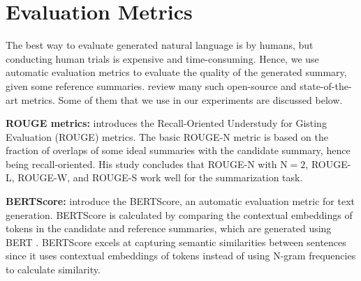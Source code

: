 \section{Evaluation Metrics}
\label{sec:metrics}

The best way to evaluate generated natural language is by humans, but conducting
human trials is expensive and time-consuming.
Hence, we use automatic evaluation metrics to evaluate the quality of the generated
summary, given some reference summaries.
\citet{fabbri2021summeval} review many such open-source and state-of-the-art metrics.
Some of them that we use in our experiments are discussed below.

\textbf{ROUGE metrics:} \citet{lin-2004-rouge} introduces the Recall-Oriented Understudy
for Gisting Evaluation (ROUGE) metrics.
The basic ROUGE-N metric is based on the fraction of overlaps of some ideal summaries
with the candidate summary, hence being recall-oriented.
His study concludes that ROUGE-N with $\text{N}=2$, ROUGE-L, ROUGE-W, and ROUGE-S work
well for the summarization task.

\textbf{BERTScore:} \citet{zhang2019bertscore} introduce the BERTScore, an automatic
evaluation metric for text generation.
BERTScore is calculated by comparing the contextual embeddings of tokens in the candidate
and reference summaries, which are generated using BERT \cite{devlin2018bert}.
BERTScore excels at capturing semantic similarities between sentences since it uses
contextual embeddings of tokens instead of using N-gram frequencies to calculate similarity.






